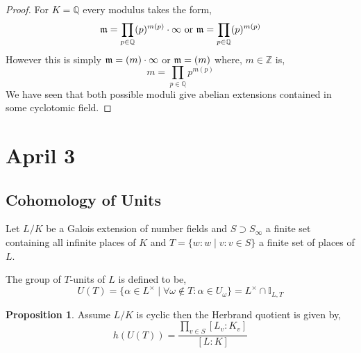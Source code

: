 \documentclass[12pt]{extarticle}
\newcommand{\divides}{\mid}
\newcommand{\Z}{\mathbb{Z}}
\newcommand{\Q}{\mathbb{Q}}
\newcommand{\sidele}[2]{\mathbb{I}_{#1, #2}}
\theoremstyle{definition}
\newtheorem{proposition}[theorem]{Proposition}
\newenvironment{definition}[1][Definition:]{\begin{trivlist}
\item[\hskip \labelsep {\bfseries #1}]}{\end{trivlist}}
\begin{document}
\begin{proof}
For $K = \Q$ every modulus takes the form,
\[ \m = \prod_{p \in \Q} (p)^{m(p)} \cdot \infty \text{ or } \m = \prod_{p \in \Q} (p)^{m(p)} \]
However this is simply $\mathfrak{m} = (m) \cdot \infty$ or $\mathfrak{m} = (m)$ where, $m \in \Z$ is,
\[ m = \prod_{p \in \Q} p^{m(p)} \]
We have seen that both possible moduli give abelian extensions contained in some cyclotomic field. 

\end{proof}

\section{April 3}

\subsection{Cohomology of Units}

Let $L/K$ be a Galois extension of number fields and $S \supset S_\infty$ a finite set containing all infinite places of $K$ and $T = \{  w : w \divides v : v \in S \}$ a finite set of places of $L$.

\begin{definition}
The group of $T$-units of $L$ is defined to be,
\[ U(T) = \{ \alpha \in L^\times \mid \forall \omega \notin T : \alpha \in U_\omega  \} = L^\times \cap \sidele{L}{T} \]
\end{definition}

\begin{proposition}
Assume $L / K$ is cyclic then the Herbrand quotient is given by,
\[ h(U(T)) = \frac{\prod\limits_{v \in S} [L_v : K_v]}{[L : K]} \] 
\end{proposition}

\newcommand{\Ind}{\mathrm{Ind}}
\end{document}
